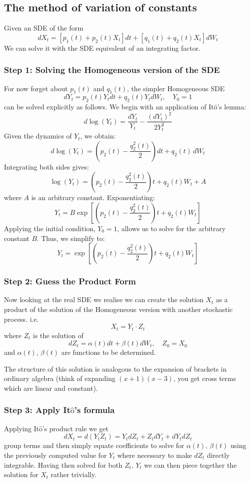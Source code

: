 \documentclass[12pt]{article}
\newcommand{\Itos}{It$\hat{\text{o}}$'s }
\begin{document}
\subsection*{The method of variation of constants}
Given an SDE of the form
\[
dX_t = \left[ p_1(t) + p_2(t)X_t\right]dt + \left[ q_1(t) + q_2(t)X_t\right]dW_t
\]
We can solve it with the SDE equivalent of an integrating factor.
\subsubsection*{Step 1: Solving the Homogeneous version of the SDE}
For now forget about \(p_1(t)\) and \(q_1(t)\), the simpler Homogeneous SDE
\[
dY_t = p_2(t)Y_tdt+q_2(t)Y_tdW_t, \quad Y_0=1
\]
can be solved explicitly as follows. We begin with an application of \Itos lemma:
\[
d\log(Y_t) = \frac{dY_t}{Y_t} - \frac{(dY_t)^2}{2Y_t^2}
\]
Given the dynamics of \( Y_t \), we obtain:
\[
d\log(Y_t) = \left( p_2(t) - \frac{q_2^2(t)}{2} \right) dt + q_2(t) \, dW_t
\]
Integrating both sides gives:
\[
\log(Y_t) = \left( p_2(t) - \frac{q_2^2(t)}{2} \right)t + q_2(t)W_t + A
\]
where $A$ is an arbitrary constant. Exponentiating:
\[
Y_t = B \exp\left[ \left( p_2(t) - \frac{q_2^2(t)}{2} \right)t + q_2(t)W_t \right]
\]
Applying the initial condition, \( Y_0 = 1 \), allows us to solve for the arbitrary constant $B$. Thus, we simplify to:
\[
Y_t = \exp\left[ \left( p_2(t) - \frac{q_2^2(t)}{2} \right)t + q_2(t)W_t \right]
\]

\subsubsection*{Step 2: Guess the Product Form}
Now looking at the real SDE we realise we can create the solution \(X_t\) as a product of the solution of the Homogeneous version with another stochastic process. i.e.
\[
X_t = Y_t\cdot Z_t
\]
where \(Z_t\) is the solution of
\[
dZ_t = \alpha(t)dt + \beta(t)dW_t, \quad Z_0 = X_0
\]
and \(\alpha(t),\,\beta(t)\) are functions to be determined.

The structure of this solution is analogous to the expansion of brackets in ordinary algebra (think of expanding \((x+1)(x-3)\), you get cross terms which are linear and constant).

\subsubsection*{Step 3: Apply \Itos formula}
Applying \Itos product rule we get
\[
dX_t = d(Y_tZ_t) = Y_tdZ_t + Z_tdY_t + dY_tdZ_t
\]
group terms and then simply equate coefficients to solve for \(\alpha(t),\,\beta(t)\) using the previously computed value for \(Y_t\) where necessary to make \(dZ_t\) directly integrable. Having then solved for both \(Z_t,\,Y_t\) we can then piece together the solution for \(X_t\) rather trivially.
\end{document}
